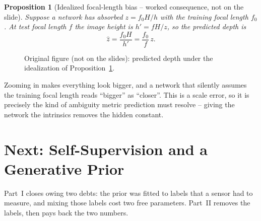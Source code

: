 \documentclass[11pt,a4paper]{article}
\theoremstyle{definition}
\theoremstyle{plain}
\newtheorem{proposition}[definition]{Proposition}
\theoremstyle{remark}
\begin{document}
\begin{proposition}[Idealized focal-length bias -- worked consequence, not on the slide]\label{prop:focal}
Suppose a network has absorbed $z=f_0H/h$ with the training focal length $f_0$. At test focal length $f$ the image height is $h'=fH/z$, so the predicted depth is
\[
\hat z=\frac{f_0H}{h'}=\frac{f_0}{f}\,z .
\]
\end{proposition}
 
\begin{figure}[htbp]
\centering
{}
\caption{Original figure (not on the slides): predicted depth under the idealization of Proposition~\ref{prop:focal}.}
\end{figure}
 
\begin{intuition}
Zooming in makes everything look bigger, and a network that silently assumes the training focal length reads ``bigger'' as ``closer''. This is a scale error, so it is precisely the kind of ambiguity metric prediction must resolve -- giving the network the intrinsics removes the hidden constant.
\end{intuition}

\section*{Next: Self-Supervision and a Generative Prior }

Part~I closes owing two debts: the prior was fitted to labels that a sensor had to measure, and mixing those labels cost two free parameters. Part~II removes the labels, then pays back the two numbers.
\end{document}
